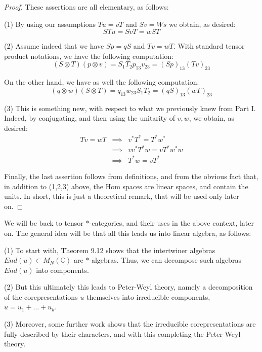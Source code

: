 \documentclass[12pt]{amsbook}
\begin{document}
\begin{proof}
These assertions are all elementary, as follows:

\medskip

(1) By using our assumptions $Tu=vT$ and $Sv=Ws$ we obtain, as desired:
$$STu
=SvT
=wST$$

(2) Assume indeed that we have $Sp=qS$ and $Tv=wT$. With standard tensor product notations, we have the following computation:
$$(S\otimes T)(p\otimes v)
=S_1T_2p_{13}v_{23}
=(Sp)_{13}(Tv)_{23}$$

On the other hand, we have as well the following computation:
$$(q\otimes w)(S\otimes T)
=q_{13}w_{23}S_1T_2
=(qS)_{13}(wT)_{23}$$

(3) This is something new, with respect to what we previously knew from Part I. Indeed, by conjugating, and then using the unitarity of $v,w$, we obtain, as desired:
\begin{eqnarray*}
Tv=wT
&\implies&v^*T^*=T^*w^*\\
&\implies&vv^*T^*w=vT^*w^*w\\
&\implies&T^*w=vT^*
\end{eqnarray*}

Finally, the last assertion follows from definitions, and from the obvious fact that, in addition to (1,2,3) above, the Hom spaces are linear spaces, and contain the units. In short, this is just a theoretical remark, that will be used only later on.
\end{proof}

We will be back to tensor $*$-categories, and their uses in the above context, later on. The general idea will be that all this leads us into linear algebra, as follows:

\bigskip

(1) To start with, Theorem 9.12 shows that the intertwiner algebras $End(u)\subset M_N(\mathbb C)$ are $*$-algebras. Thus, we can decompose such algebras $End(u)$ into components.

\bigskip

(2) But this ultimately this leads to Peter-Weyl theory, namely a decomposition of the corepresentations $u$ themselves into irreducible components, $u=u_1+\ldots+u_k$. 

\bigskip

(3) Moreover, some further work shows that the irreducible corepresentations are fully described by their characters, and with this completing the Peter-Weyl theory.

\bigskip
\end{document}
